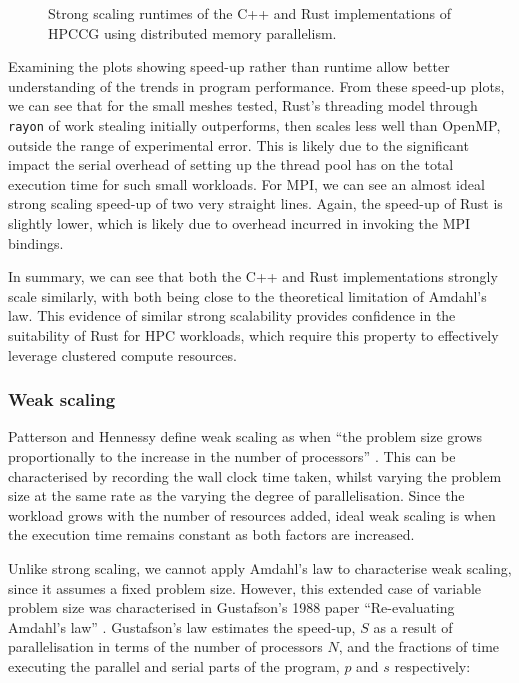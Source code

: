 \begin{figure}[H]
    \centering
    \fbox{}
    \captionsetup{skip=0pt}
    \caption{Strong scaling runtimes of the C++ and Rust implementations of \acrshort{HPCCG} using distributed memory parallelism.}
    \label{fig:strong_scaling_speedup_mpi}
\end{figure}

Examining the plots showing speed-up rather than runtime allow better understanding of the trends in program performance. From these speed-up plots, we can see that for the small meshes tested, Rust's threading model through \texttt{rayon} of work stealing initially outperforms, then scales less well than OpenMP, outside the range of experimental error. This is likely due to the significant impact the serial overhead of setting up the thread pool has on the total execution time for such small workloads. For MPI, we can see an almost ideal strong scaling speed-up of two very straight lines. Again, the speed-up of Rust is slightly lower, which is likely due to overhead incurred in invoking the MPI bindings.

In summary, we can see that both the C++ and Rust implementations strongly scale similarly, with both being close to the theoretical limitation of Amdahl's law. This evidence of similar strong scalability provides confidence in the suitability of Rust for \acrshort{HPC} workloads, which require this property to effectively leverage clustered compute resources.

\subsubsection{Weak scaling}
\label{sssec:weak-scaling}

Patterson and Hennessy define weak scaling as when ``the problem size grows proportionally to the increase in the number of processors'' \cite{pattersonHennessyComputerOrganisationArchitecture}. This can be characterised by recording the wall clock time taken, whilst varying the problem size at the same rate as the varying the degree of parallelisation. Since the workload grows with the number of resources added, ideal weak scaling is when the execution time remains constant as both factors are increased.

Unlike strong scaling, we cannot apply Amdahl's law to characterise weak scaling, since it assumes a fixed problem size. However, this extended case of variable problem size was characterised in Gustafson's 1988 paper ``Re-evaluating Amdahl's law'' \cite{gustafsonReevaluatingAmdahlLaw1988}. Gustafson's law estimates the speed-up, $S$ as a result of parallelisation in terms of the number of processors $N$, and the fractions of time executing the parallel and serial parts of the program, $p$ and $s$ respectively:

